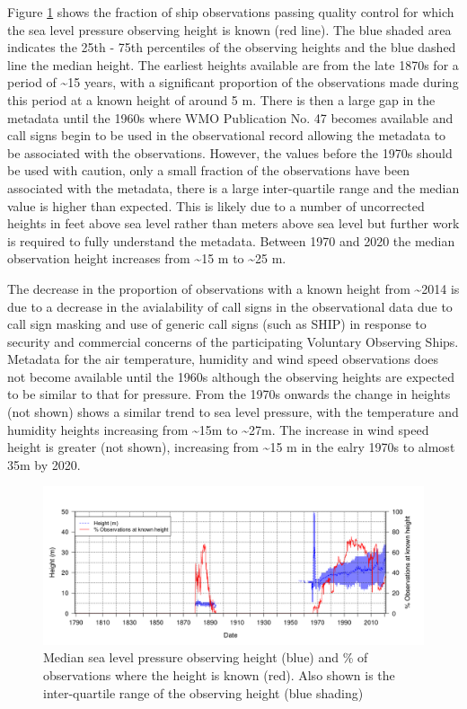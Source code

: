 Figure \ref{fig:slp_heights} shows the fraction of ship observations passing quality control for which the sea level pressure observing height is known (red line). The blue shaded area indicates the 25th - 75th percentiles of the observing heights and the blue dashed line the median height. 
The earliest heights available are from the late 1870s for a period of \sim 15 years, with a significant proportion of the observations made during this period at a known height of around 5 m. 
There is then a large gap in the metadata until the 1960s where WMO Publication No. 47 becomes available and call signs begin to be used in the observational record allowing the metadata to be associated with the observations. 
However, the values before the 1970s should be used with caution, only a small fraction of the observations have been associated with the metadata, there is a large inter-quartile range and the median value is higher than expected.
This is likely due to a number of uncorrected heights in feet above sea level rather than meters above sea level but further work is required to fully understand the metadata.
Between 1970 and 2020 the median observation height increases from \sim 15 m to \sim 25 m.

The decrease in the proportion of observations with a known height from \sim 2014 is due to a decrease in the avialability of call signs in the observational data due to call sign masking and use of generic call signs (such as SHIP) in response to security and commercial concerns of the participating Voluntary Observing Ships.
Metadata for the air temperature, humidity and wind speed observations does not become available until the 1960s although the observing heights are expected to be similar to that for pressure. 
From the 1970s onwards the change in heights (not shown) shows a similar trend to sea level pressure, with the temperature and humidity heights increasing from \sim 15m to \sim 27m. 
The increase in wind speed height is greater (not shown), increasing from \sim 15 m in the ealry 1970s to almost 35m by 2020.

\begin{figure}[h]
    \includegraphics[width=18cm]{resources/brmh.png}
    \caption{Median sea level pressure observing height (blue) and \% of observations where the height is known (red). Also shown is the inter-quartile range of the observing height (blue shading)}
    \label{fig:slp_heights}
\end{figure}

